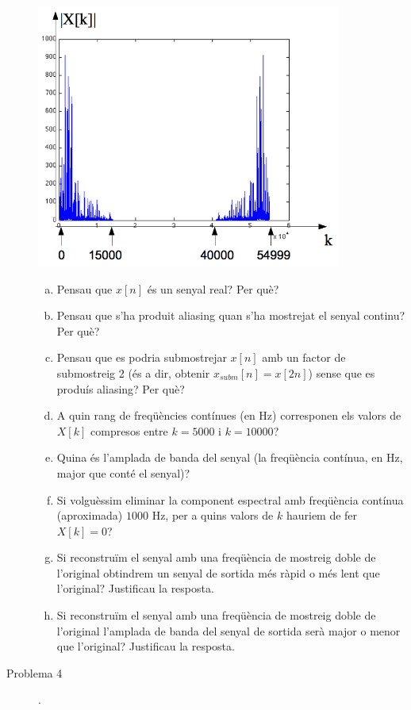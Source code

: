\documentclass{article}[12pt]
\begin{document}
\begin{description}
\begin{center}
\includegraphics[width=10cm]{fftP3b.png}
\end{center}

\begin{enumerate}[a)]
\item Pensau que $x[n]$ és un senyal real? Per què?
\item Pensau que s'ha produit aliasing quan s'ha mostrejat el senyal continu? Per què?
\item Pensau que es podria submostrejar $x[n]$ amb un factor de submostreig 2
(és a dir, obtenir $x_{subm}[n]=x[2n]$) sense que es produís aliasing? Per què?
\item A quin rang de freqüències contínues (en Hz)  corresponen els valors de $X[k]$ compresos entre $k=5000$ i $k=10000$?
\item Quina és l'amplada de banda del senyal (la freqüència contínua, en Hz, major que conté el senyal)?
\item Si volguèssim eliminar la component espectral amb freqüència contínua (aproximada) $1000$ Hz, per a quins
valors de $k$ hauriem de fer $X[k]=0$?
\item Si reconstruïm el senyal amb una freqüència de mostreig doble de l'original obtindrem un senyal
de sortida més ràpid o més lent que l'original? Justificau la resposta.
\item Si reconstruïm el senyal amb una freqüència de mostreig doble de l'original l'amplada de banda del
senyal de sortida serà major o menor que l'original? Justificau la resposta.
\end{enumerate}  

\vskip 0.5cm


\item[Problema 4].


\end{description}
\end{document}
